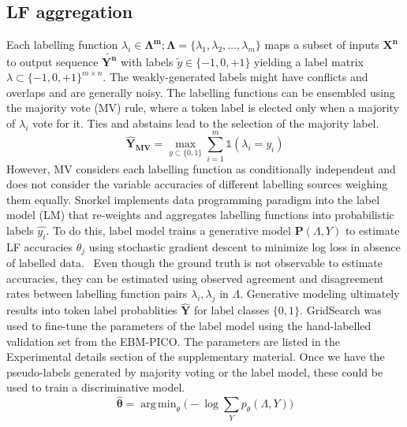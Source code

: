 \documentclass[10.7pt,]{article}
\DeclareMathOperator*{\argmin}{arg\,min}
\begin{document}
\subsection{LF aggregation}\label{lms}
%
Each labelling function $ \lambda_{i} \in \bm{\Lambda^{m}}; \bm{\Lambda} = \{\lambda_{1}, \lambda_{2}, \dotso, \lambda_{m} \} $ maps a subset of inputs $\bm{X^{n}}$ to output sequence $ \widetilde{\bm{Y^{n}}}$ with labels $\widetilde{y} \in \{-1, 0, +1\}$ yielding a label matrix $ \lambda \subset \{-1, 0, +1\}^{m \times n}$.
The weakly-generated labels might have conflicts and overlaps and are generally noisy.
The labelling functions can be ensembled using the majority vote (MV) rule, where a token label is elected only when a majority of $\lambda_{i}$ vote for it.
Ties and abstains lead to the selection of the majority label.
%
\begin{equation}
\bm{\hat{Y}_{MV}} = \max_{{y \subset \{ 0, 1 \} }} \sum_{i=1}^{m} \mathds{1} (\lambda_{i} = y_{i})
\end{equation}
%
However, MV considers each labelling function as conditionally independent and does not consider the variable accuracies of different labelling sources weighing them equally.
Snorkel implements data programming paradigm into the label model (LM) that re-weights and aggregates labelling functions into probabilistic labels $\hat{y_{i}}$.
To do this, label model trains a generative model $ \bm{P} ( \Lambda , Y )$ to estimate LF accuracies $\theta_{j}$ using stochastic gradient descent to minimize log loss in absence of labelled data.~\cite{ratner2017snorkel,dunnmon2020cross}
Even though the ground truth is not observable to estimate accuracies, they can be estimated using observed agreement and disagreement rates between labelling function pairs $ \lambda_{i}, \lambda_{j}$ in $\Lambda$.
Generative modeling ultimately results into token label probablities $\bm{\hat{Y}}$ for label classes $ \{ 0, 1\} $.
GridSearch was used to fine-tune the parameters of the label model using the hand-labelled validation set from the EBM-PICO.
The parameters are listed in the Experimental details section of the supplementary material.
Once we have the pseudo-labels generated by majority voting or the label model, these could be used to train a discriminative model.
%
\begin{equation}
\bm{\hat{\theta}} = \argmin_{\theta} \big( -\log \sum_{Y} p_{\theta} (\Lambda , Y ) \big)
\end{equation}
%
%
%
\end{document}
